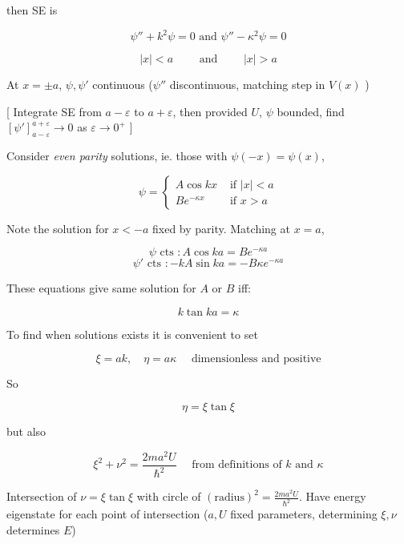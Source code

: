 \documentclass[a4paper]{article}
\begin{document}
then SE is 

\[ \psi''  + k^{2} \psi = 0 \text{ and } \psi'' - \kappa^{2} \psi = 0 \]

\[ | x | < a \qquad \text{ and } \qquad | x | > a \]

At $ x = \pm a $, $ \psi,\psi' $ continuous ($ \psi'' $ discontinuous, matching step in $ V(x) $ )

[ Integrate SE from $ a - \varepsilon $ to $ a + \varepsilon $, then provided $ U $, $ \psi $ bounded, find $ [\psi']_{a - \varepsilon}^{a + \varepsilon} \to 0 $ as $ \varepsilon \to 0^{+} $ ]

Consider \emph{even parity} solutions, ie. those with $ \psi(-x) = \psi(x) $,

\[ \psi = \begin{cases} A \cos k x  & \text{ if } | x | < a \\ Be^{-\kappa x} & \text{ if } x > a \end{cases} \]

Note the solution for $ x < -a $ fixed by parity. Matching at $ x = a $,

\[ \psi \text{ cts }: A \cos k a = B e^{-\kappa a} \]
\[ \psi' \text{ cts }: - k A \sin k a = - B \kappa e^{-\kappa a} \]

These equations give same solution for $ A $ or $ B $ iff:

\[ k \tan k a = \kappa \]

To find when solutions exists it is convenient to set

\[ \xi = a k, \quad \eta = a \kappa \quad \text{ dimensionless and positive} \]

So 

\[ \eta = \xi \tan \xi \]

but also 

\[ \xi^{2} + \nu^{2} = \frac{2ma^{2}U}{\hbar^{2}} \quad \text{ from definitions of } k \text{ and } \kappa \]

Intersection of $ \nu = \xi \tan \xi $ with circle of $ (\text{radius})^{2} = \frac{2ma^{2} U}{\hbar^{2}} $. Have energy eigenstate for each point of intersection ($ a,U $ fixed parameters, determining $ \xi,\nu $ determines $ E $)
\end{document}
